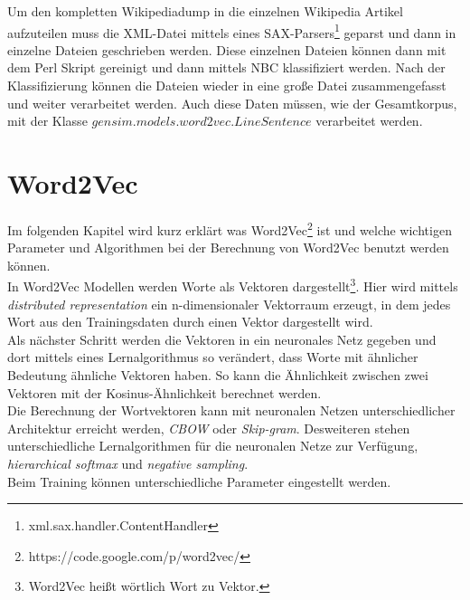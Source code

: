 \documentclass[12pt,a4paper]{report}
\begin{document}
	Um den kompletten Wikipediadump in die einzelnen Wikipedia Artikel aufzuteilen muss die XML-Datei mittels eines SAX-Parsers\footnote{xml.sax.handler.ContentHandler} geparst und dann in einzelne Dateien geschrieben werden. Diese einzelnen Dateien können dann mit dem Perl Skript gereinigt und dann mittels NBC klassifiziert werden. Nach der Klassifizierung können die Dateien wieder in eine große Datei zusammengefasst und weiter verarbeitet werden. Auch diese Daten müssen, wie der Gesamtkorpus, mit der Klasse $gensim.models.word2vec.LineSentence$ verarbeitet werden.
\newpage
\chapter{Word2Vec}
Im folgenden Kapitel wird kurz erklärt was Word2Vec\footnote{https://code.google.com/p/word2vec/} ist und welche wichtigen Parameter und Algorithmen bei der Berechnung von Word2Vec benutzt werden können.\\

In Word2Vec Modellen werden Worte als Vektoren dargestellt\footnote{Word2Vec heißt wörtlich Wort zu Vektor.}. Hier wird mittels \textit{distributed representation}\cite{DBLP:journals/corr/abs-1301-3781} ein n-dimensionaler Vektorraum erzeugt, in dem jedes Wort aus den Trainingsdaten durch einen Vektor dargestellt wird.\\
Als nächster Schritt werden die Vektoren in ein neuronales Netz gegeben und dort mittels eines Lernalgorithmus so verändert, dass Worte mit ähnlicher Bedeutung ähnliche Vektoren haben. So kann die Ähnlichkeit zwischen zwei Vektoren mit der Kosinus-Ähnlichkeit berechnet werden.\\
Die Berechnung der Wortvektoren kann mit neuronalen Netzen unterschiedlicher Architektur erreicht werden, \textit{CBOW} oder \textit{Skip-gram}. Desweiteren stehen unterschiedliche Lernalgorithmen für die neuronalen Netze zur Verfügung, \textit{hierarchical softmax}  und \textit{negative sampling}.\\
Beim Training können unterschiedliche Parameter eingestellt werden.\\
\end{document}
